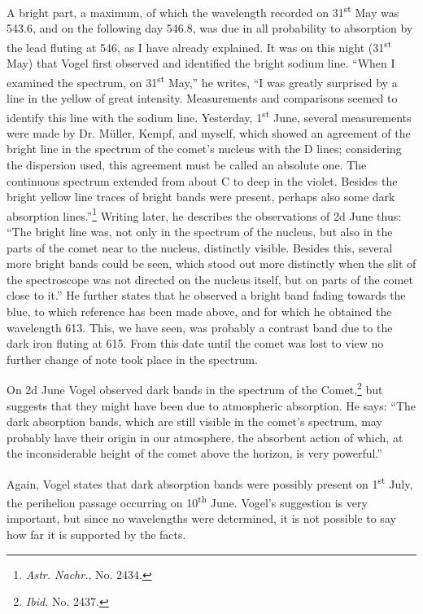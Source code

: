 \documentclass[a4paper, 12pt, oneside, polutonikogreek, english]{article}
\begin{document}
A bright part, a maximum, of which the wavelength recorded on 31\textsuperscript{st} May was 543.6, and on the following day 546.8, was due in all probability to absorption by the lead fluting at 546, as I have already explained. It was on this night (31\textsuperscript{st} May) that Vogel first observed and identified the bright sodium line. ``When I examined the spectrum, on 31\textsuperscript{st} May,'' he writes, ``I was greatly surprised by a line in the yellow of great intensity. Measurements and comparisons seemed to identify this line with the sodium line. Yesterday, 1\textsuperscript{st} June, several measurements were made by Dr. Müller, Kempf, and myself, which showed an agreement of the bright line in the spectrum of the comet's nucleus with the D lines; considering the dispersion used, this agreement must be called an absolute one. The continuous spectrum extended from about C to deep in the violet. Besides the bright yellow line traces of bright bands were present, perhaps also some dark absorption lines.''\footnote{\emph{Astr. Nachr.}, No. 2434.} Writing later, he describes the observations of 2d June thus: ``The bright line was, not only in the spectrum of the nucleus, but also in the parts of the comet near to the nucleus, distinctly visible. Besides this, several more bright bands could be seen, which stood out more distinctly when the slit of the spectroscope was not directed on the nucleus itself, but on parts of the comet close to it.'' He further states that he observed a bright band fading towards the blue, to which reference has been made above, and for which he obtained the wavelength 613. This, we have seen, was probably a contrast band due to the dark iron fluting at 615. From this date until the comet was lost to view no further change of note took place in the spectrum.

On 2d June Vogel observed dark bands in the spectrum of the Comet,\footnote{\emph{Ibid.} No. 2437.} but suggests that they might have been due to atmospheric absorption. He says: ``The dark absorption bands, which are still visible in the comet's spectrum, may probably have their origin in our atmosphere, the absorbent action of which, at the inconsiderable height of the comet above the horizon, is very powerful.''

Again, Vogel states that dark absorption bands were possibly present on 1\textsuperscript{st} July, the perihelion passage occurring on 10\textsuperscript{th} June. Vogel's suggestion is very important, but since no wavelengths were determined, it is not possible to say how far it is supported by the facts.
\end{document}
